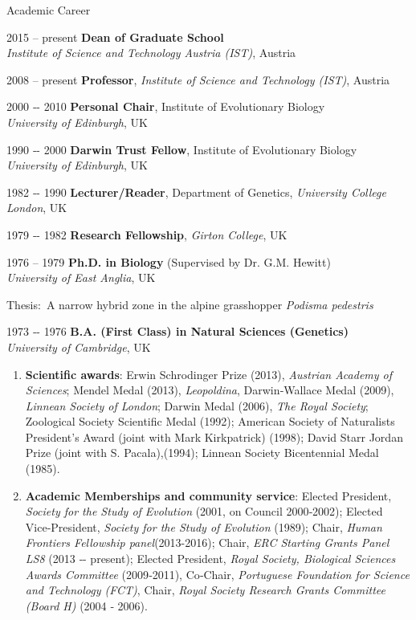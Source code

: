 \documentclass[10pt]{article}
\newenvironment{sublist}{%
	\begin{list}{}{%
		\setlength{\itemsep}{0em}\setlength{\parsep}{0em}%
		\setlength{\topsep}{0em}\setlength{\parskip}{0em}%
	}%
}%
{ \end{list} }
\begin{document}
\begin{cv}
\begin{cvlist}{Academic Career}
\item[2015 -- present] \textbf{Dean of Graduate School}\\
\textit{Institute of Science and Technology Austria (IST)}, Austria
\item[2008 -- present] \textbf{Professor}, \textit{Institute of Science and Technology (IST)}, Austria
\item[2000 ‐- 2010] \textbf{Personal Chair}, Institute of Evolutionary Biology\\
 \textit{University of Edinburgh}, UK
\item[1990 ‐- 2000]  \textbf{Darwin Trust Fellow}, Institute of Evolutionary Biology\\
 \textit{University of Edinburgh}, UK
\item[1982 ‐- 1990]  \textbf{Lecturer/Reader}, Department of Genetics, 
 \textit{University College London}, UK
\item[1979 ‐- 1982] \textbf{Research Fellowship},  \textit{Girton College}, UK
\item[1976 -- 1979]   \textbf{Ph.D. in Biology} (Supervised by Dr. G.M. Hewitt)\\
       \textit{University of East Anglia}, UK
        \begin{sublist}
     		\item Thesis:~A narrow hybrid zone in the alpine grasshopper \textit{Podisma pedestris}
	       \end{sublist}
\item[1973 ‐- 1976] \textbf{B.A. (First Class) in Natural Sciences (Genetics)}\\
              \textit{University of Cambridge}, UK   
\end{cvlist}

\begin{enumerate}
\item \textbf{Scientific awards}:  Erwin Schrodinger Prize (2013), \textit{Austrian Academy of Sciences}; Mendel Medal (2013),  \textit{Leopoldina}, Darwin‐Wallace Medal (2009), \textit{Linnean Society of London}; Darwin Medal (2006), \textit{The Royal Society}; Zoological Society Scientific Medal (1992); American Society of Naturalists President's Award (joint with Mark Kirkpatrick) (1998); David Starr Jordan Prize (joint with S. Pacala),(1994); Linnean Society Bicentennial Medal (1985). 

\item \textbf{Academic Memberships and community service}: Elected President, \textit{Society for the Study of Evolution} (2001, on Council 2000‐2002); Elected Vice‐President, \textit{Society for the Study of Evolution} (1989); Chair, \textit{Human Frontiers Fellowship panel}(2013-2016);         
Chair, \textit{ERC Starting Grants Panel LS8 }(2013 ‐- present); Elected President, \textit{Royal Society, Biological Sciences Awards Committee} (2009‐2011), Co‐Chair, \textit{Portuguese Foundation for Science and Technology (FCT)}, Chair, \textit{Royal Society Research Grants Committee (Board H)} (2004 ‐ 2006).


\end{enumerate}
\end{cv}
\end{document}
